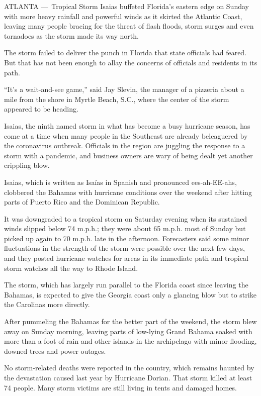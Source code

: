 ATLANTA ---~Tropical Storm Isaias buffeted Florida's eastern edge on
Sunday with more heavy rainfall and powerful winds as it skirted the
Atlantic Coast, leaving many people bracing for the threat of flash
floods, storm surges and even tornadoes as the storm made its way north.

The storm failed to deliver the punch in Florida that state officials
had feared. But that has not been enough to allay the concerns of
officials and residents in its path.

``It's a wait-and-see game,'' said Jay Slevin, the manager of a pizzeria
about a mile from the shore in Myrtle Beach, S.C., where the center of
the storm appeared to be heading.

Isaias, the ninth named storm in what has become a busy hurricane
season, has come at a time when many people in the Southeast are already
beleaguered by the coronavirus outbreak. Officials in the region are
juggling the response to a storm with a pandemic, and business owners
are wary of being dealt yet another crippling blow.

Isaias, which is written as Isaías in Spanish and pronounced
ees-ah-EE-ahs, clobbered the Bahamas with hurricane conditions over the
weekend after hitting parts of Puerto Rico and the Dominican Republic.

It was downgraded to a tropical storm on Saturday evening when its
sustained winds slipped below 74 m.p.h.; they were about 65 m.p.h. most
of Sunday but picked up again to 70 m.p.h. late in the afternoon.
Forecasters said some minor fluctuations in the strength of the storm
were possible over the next few days, and they posted hurricane watches
for areas in its immediate path and tropical storm watches all the way
to Rhode Island.

The storm, which has largely run parallel to the Florida coast since
leaving the Bahamas, is expected to give the Georgia coast only a
glancing blow but to strike the Carolinas more directly.

After pummeling the Bahamas for the better part of the weekend, the
storm blew away on Sunday morning, leaving parts of low-lying Grand
Bahama soaked with more than a foot of rain and other islands in the
archipelago with minor flooding, downed trees and power outages.

No storm-related deaths were reported in the country, which remains
haunted by the devastation caused last year by Hurricane Dorian. That
storm killed at least 74 people. Many storm victims are still living in
tents and damaged homes.

